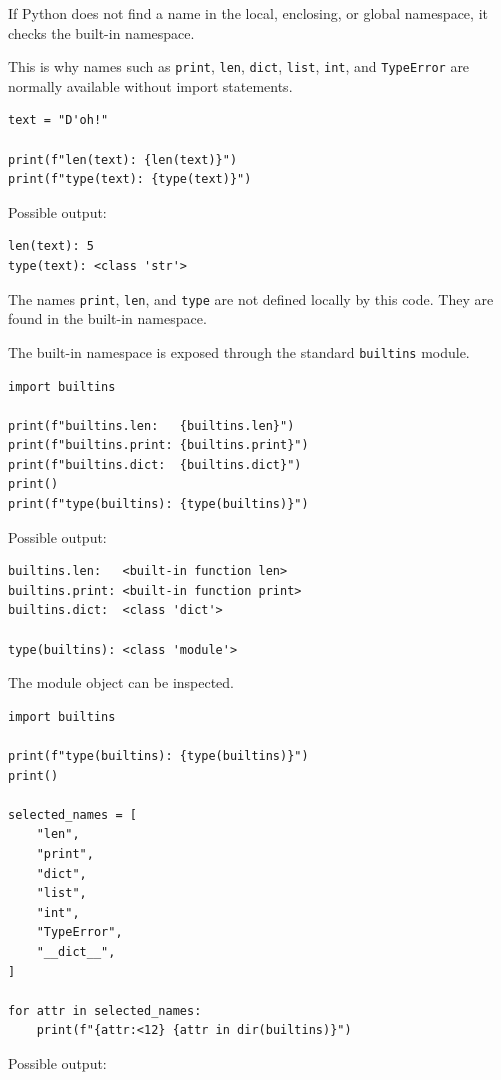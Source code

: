 If Python does not find a name in the local, enclosing, or global namespace, it checks the built-in namespace.

This is why names such as \texttt{print}, \texttt{len}, \texttt{dict}, \texttt{list}, \texttt{int}, and \texttt{TypeError} are normally available without import statements.

\begin{verbatim}
text = "D'oh!"

print(f"len(text): {len(text)}")
print(f"type(text): {type(text)}")
\end{verbatim}

Possible output:

\begin{verbatim}
len(text): 5
type(text): <class 'str'>
\end{verbatim}

The names \texttt{print}, \texttt{len}, and \texttt{type} are not defined locally by this code. They are found in the built-in namespace.

The built-in namespace is exposed through the standard \texttt{builtins} module.

\begin{verbatim}
import builtins

print(f"builtins.len:   {builtins.len}")
print(f"builtins.print: {builtins.print}")
print(f"builtins.dict:  {builtins.dict}")
print()
print(f"type(builtins): {type(builtins)}")
\end{verbatim}

Possible output:

\begin{verbatim}
builtins.len:   <built-in function len>
builtins.print: <built-in function print>
builtins.dict:  <class 'dict'>

type(builtins): <class 'module'>
\end{verbatim}

The module object can be inspected.

\begin{verbatim}
import builtins

print(f"type(builtins): {type(builtins)}")
print()

selected_names = [
    "len",
    "print",
    "dict",
    "list",
    "int",
    "TypeError",
    "__dict__",
]

for attr in selected_names:
    print(f"{attr:<12} {attr in dir(builtins)}")
\end{verbatim}

Possible output:

